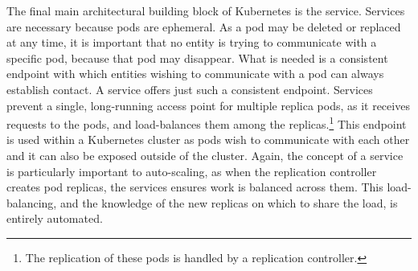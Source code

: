 The final main architectural building block of Kubernetes is the service.
Services are necessary because pods are ephemeral. As a pod may be deleted or
replaced at any time, it is important that no entity is trying to communicate
with a specific pod, because that pod may disappear. What is needed is a
consistent endpoint with which entities wishing to communicate with a pod can
always establish contact. A service offers just such a consistent endpoint. Services prevent a
single, long-running access point for multiple replica pods, as it receives
requests to the pods, and load-balances them among the replicas.\footnote{The replication of
these pods is handled by a replication controller.} This endpoint is used within
a Kubernetes cluster as pods wish to communicate with each other and it can also
be exposed outside of the cluster. Again, the concept of a service is
particularly important to auto-scaling, as when the replication
controller creates pod replicas, the services ensures work is balanced across
them. This load-balancing, and the knowledge of the new replicas on which to
share the load, is entirely automated.\cite{k8s-services}
